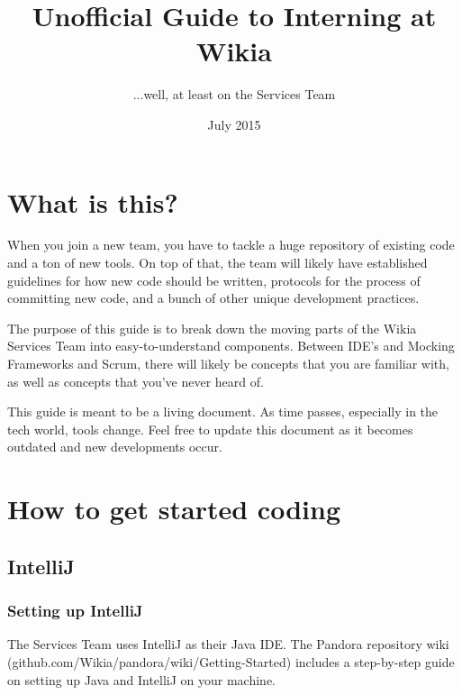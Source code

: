 \documentclass[oneside]{book}
\begin{document}
\title{Unofficial Guide to Interning at Wikia}
\author{...well, at least on the Services Team}
\date{July 2015}
\maketitle
\tableofcontents
\chapter{What is this?}
When you join a new team, you have to tackle a huge repository of existing code and a ton of new tools. On top of that, the team will likely have established guidelines for how new code should be written, protocols for the process of committing new code, and a bunch of other unique development practices.\par
The purpose of this guide is to break down the moving parts of the Wikia Services Team into easy-to-understand components. Between IDE's and Mocking Frameworks and Scrum, there will likely be concepts that you are familiar with, as well as concepts that you've never heard of.\par
This guide is meant to be a living document. As time passes, especially in the tech world, tools change. Feel free to update this document as it becomes outdated and new developments occur.
\chapter{How to get started coding}
\section{IntelliJ}
\subsection{Setting up IntelliJ}
The Services Team uses IntelliJ as their Java IDE. The Pandora repository wiki (github.com/Wikia/pandora/wiki/Getting-Started) includes a step-by-step guide on setting up Java and IntelliJ on your machine.
\end{document}
